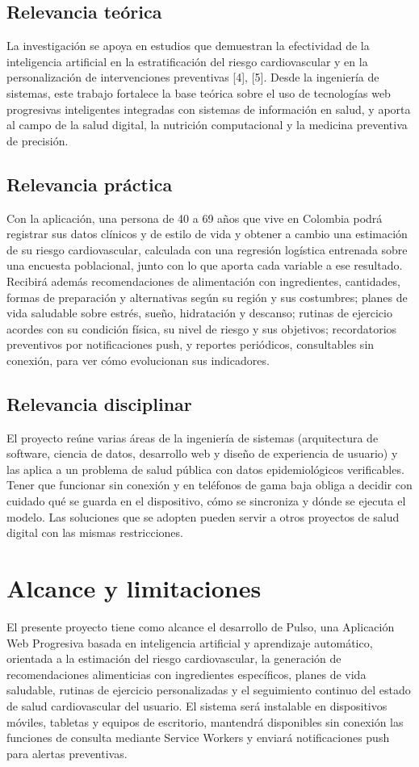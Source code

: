 \documentclass[conference]{IEEEtran}
\begin{document}
\subsection{Relevancia teórica}
La investigación se apoya en estudios que demuestran la efectividad de la inteligencia artificial en la estratificación del riesgo cardiovascular y en la personalización de intervenciones preventivas [4], [5]. Desde la ingeniería de sistemas, este trabajo fortalece la base teórica sobre el uso de tecnologías web progresivas inteligentes integradas con sistemas de información en salud, y aporta al campo de la salud digital, la nutrición computacional y la medicina preventiva de precisión.

\subsection{Relevancia práctica}
Con la aplicación, una persona de 40 a 69 años que vive en Colombia podrá registrar sus datos clínicos y de estilo de vida y obtener a cambio una estimación de su riesgo cardiovascular, calculada con una regresión logística entrenada sobre una encuesta poblacional, junto con lo que aporta cada variable a ese resultado. Recibirá además recomendaciones de alimentación con ingredientes, cantidades, formas de preparación y alternativas según su región y sus costumbres; planes de vida saludable sobre estrés, sueño, hidratación y descanso; rutinas de ejercicio acordes con su condición física, su nivel de riesgo y sus objetivos; recordatorios preventivos por notificaciones push, y reportes periódicos, consultables sin conexión, para ver cómo evolucionan sus indicadores.

\subsection{Relevancia disciplinar}
El proyecto reúne varias áreas de la ingeniería de sistemas (arquitectura de software, ciencia de datos, desarrollo web y diseño de experiencia de usuario) y las aplica a un problema de salud pública con datos epidemiológicos verificables. Tener que funcionar sin conexión y en teléfonos de gama baja obliga a decidir con cuidado qué se guarda en el dispositivo, cómo se sincroniza y dónde se ejecuta el modelo. Las soluciones que se adopten pueden servir a otros proyectos de salud digital con las mismas restricciones.

\section{Alcance y limitaciones}
El presente proyecto tiene como alcance el desarrollo de Pulso, una Aplicación Web Progresiva basada en inteligencia artificial y aprendizaje automático, orientada a la estimación del riesgo cardiovascular, la generación de recomendaciones alimenticias con ingredientes específicos, planes de vida saludable, rutinas de ejercicio personalizadas y el seguimiento continuo del estado de salud cardiovascular del usuario. El sistema será instalable en dispositivos móviles, tabletas y equipos de escritorio, mantendrá disponibles sin conexión las funciones de consulta mediante Service Workers y enviará notificaciones push para alertas preventivas.
\end{document}
